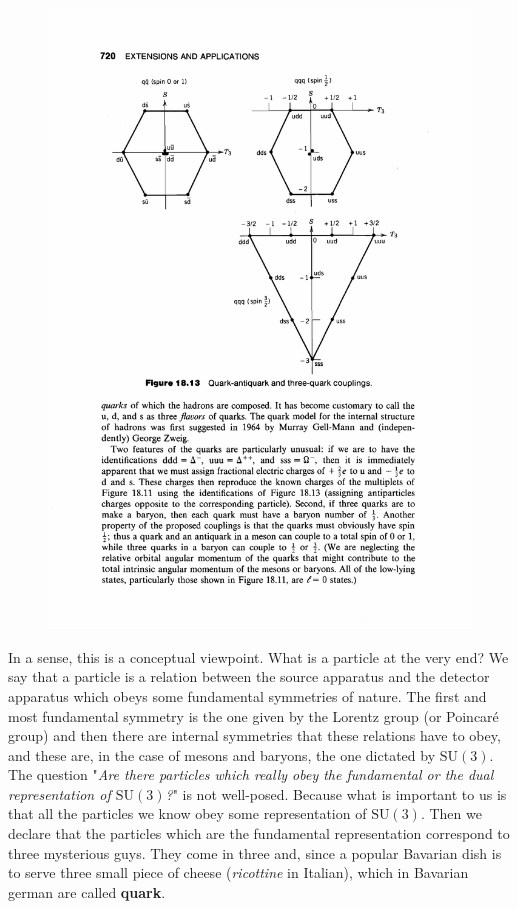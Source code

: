 \documentclass[../main.tex]{subfiles}
\begin{document}
\begin{figure}[h!]
	\includegraphics{images/krane-734_c.pdf}
	\caption[]{}
\end{figure}
In a sense, this is a conceptual viewpoint. What is a particle at the very end? We say that a particle is a relation between the source apparatus and the detector apparatus which obeys some fundamental symmetries of nature. The first and most fundamental symmetry is the one given by the Lorentz group (or Poincaré group) and then there are internal symmetries that these relations have to obey, and these are, in the case of mesons and baryons, the one dictated by $\textrm{SU}(3)$. The question "\textit{Are there particles which really obey the fundamental or the dual representation of $\textrm{SU}(3)$?}" is not well-posed. Because what is important to us is that all the particles we know obey some representation of $\textrm{SU}(3)$. Then we declare that the particles which are the fundamental representation correspond to three mysterious guys. They come in three and, since a popular Bavarian dish is to serve three small piece of cheese (\textit{ricottine} in Italian), which in Bavarian german are called \textbf{quark}.
\end{document}
